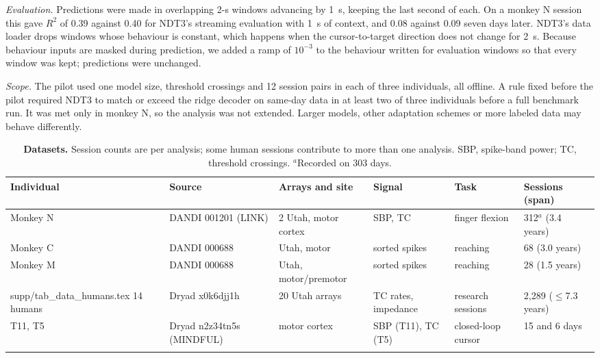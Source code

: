 \documentclass[pdflatex,sn-nature]{sn-jnl}
\makeatletter
\newcommand\tabinput[1]{\@@input #1 }
\makeatother
\begin{document}
\textit{Evaluation.} Predictions were made in overlapping 2-s windows advancing by 1~s, keeping the last second of each.
On a monkey N session this gave $R^2$ of 0.39 against 0.40 for NDT3's streaming evaluation with 1~s of context, and
0.08 against 0.09 seven days later. NDT3's data loader drops windows whose behaviour is constant, which happens when the
cursor-to-target direction does not change for 2~s. Because behaviour inputs are masked during prediction, we added a
ramp of $10^{-3}$ to the behaviour written for evaluation windows so that every window was kept; predictions were
unchanged.

\textit{Scope.} The pilot used one model size, threshold crossings and 12 session pairs in each of three individuals, all
offline. A rule fixed before the pilot required NDT3 to match or exceed the ridge decoder on same-day data in at least two
of three individuals before a full benchmark run. It was met only in monkey N, so the analysis was not extended. Larger
models, other adaptation schemes or more labeled data may behave differently.

\clearpage

\begin{landscape}
\begin{table}[p]
\caption{\textbf{Datasets.} Session counts are per analysis; some human sessions contribute to more than one analysis.
SBP, spike-band power; TC, threshold crossings. $^a$Recorded on 303 days.}
\label{tab:data}
\scriptsize\setlength{\tabcolsep}{2.2pt}
\begin{tabular}{@{}llllll@{}}
\toprule
Individual & Source & Arrays and site & Signal & Task & Sessions (span) \\
\midrule
Monkey N & DANDI 001201 (LINK) & 2 Utah, motor cortex & SBP, TC & finger flexion & 312$^a$ (3.4 years) \\
Monkey C & DANDI 000688 & Utah, motor & sorted spikes & reaching & 68 (3.0 years) \\
Monkey M & DANDI 000688 & Utah, motor/premotor & sorted spikes & reaching & 28 (1.5 years) \\
\tabinput{supp/tab_data_humans.tex}
14 humans & Dryad x0k6djj1h & 20 Utah arrays & TC rates, impedance & research sessions & 2,289 ($\leq$7.3 years) \\
T11, T5 & Dryad n2z34tn5s (MINDFUL) & motor cortex & SBP (T11), TC (T5) & closed-loop cursor & 15 and 6 days \\
\botrule
\end{tabular}
\end{table}
\end{landscape}
\end{document}
